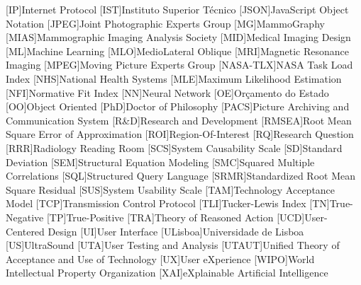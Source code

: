 \begin{acronym}[H.264/SVC]
[IP]{Internet Protocol}
[IST]{Instituto Superior T\'{e}cnico}
[JSON]{JavaScript Object Notation}
[JPEG]{Joint Photographic Experts Group}
[MG]{MammoGraphy}
[MIAS]{Mammographic Imaging Analysis Society}
[MID]{Medical Imaging Design}
[ML]{Machine Learning}
[MLO]{MedioLateral Oblique}
[MRI]{Magnetic Resonance Imaging}
[MPEG]{Moving Picture Experts Group}
[NASA-TLX]{NASA Task Load Index}
[NHS]{National Health Systems}
[MLE]{Maximum Likelihood Estimation}
[NFI]{Normative Fit Index}
[NN]{Neural Network}
[OE]{Or\c{c}amento do Estado}
[OO]{Object Oriented}
[PhD]{Doctor of Philosophy}
[PACS]{Picture Archiving and Communication System}
[R\&D]{Research and Development}
[RMSEA]{Root Mean Square Error of Approximation}
[ROI]{Region-Of-Interest}
[RQ]{Research Question}
[RRR]{Radiology Reading Room}
[SCS]{System Causability Scale}
[SD]{Standard Deviation}
[SEM]{Structural Equation Modeling}
[SMC]{Squared Multiple Correlations}
[SQL]{Structured Query Language}
[SRMR]{Standardized Root Mean Square Residual}
[SUS]{System Usability Scale}
[TAM]{Technology Acceptance Model}
[TCP]{Transmission Control Protocol}
[TLI]{Tucker-Lewis Index}
[TN]{True-Negative}
[TP]{True-Positive}
[TRA]{Theory of Reasoned Action}
[UCD]{User-Centered Design}
[UI]{User Interface}
[ULisboa]{Universidade de Lisboa}
[US]{UltraSound}
[UTA]{User Testing and Analysis}
[UTAUT]{Unified Theory of Acceptance and Use of Technology}
[UX]{User eXperience}
[WIPO]{World Intellectual Property Organization}
[XAI]{eXplainable Artificial Intelligence}
\end{acronym}